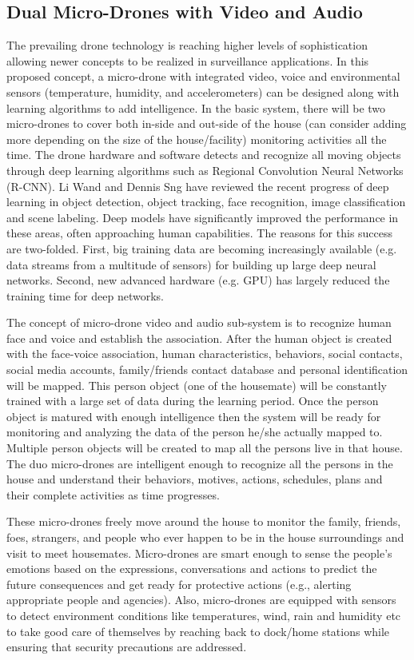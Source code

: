 \documentclass[sigconf]{acmart}
\begin{document}
\subsection{Dual Micro-Drones with Video and Audio}
The prevailing drone technology is reaching higher levels of sophistication allowing newer concepts to be realized in surveillance applications. In this proposed concept, a micro-drone with integrated video, voice and environmental sensors (temperature, humidity, and accelerometers) can be designed along with learning algorithms to add intelligence. In the basic system, there will be two micro-drones to cover both in-side and out-side of the house (can consider adding more depending on the size of the house/facility) monitoring activities all the time. The drone hardware and software detects and recognize all moving objects through deep learning algorithms such as Regional Convolution Neural Networks (R-CNN). Li Wand and Dennis Sng have reviewed the recent progress of deep learning in object detection, object tracking, face recognition, image classification and scene labeling. Deep models have significantly improved the performance in these areas, often approaching human capabilities. The reasons for this success are two-folded. First, big training data are becoming increasingly available (e.g. data streams from a multitude of sensors) for building up large deep neural networks. Second, new advanced hardware (e.g. GPU) has largely reduced the training time for deep networks\cite{Wang2015}. 

The concept of micro-drone video and audio sub-system is to recognize human face and voice and establish the association. After the human object is created with the face-voice association, human characteristics, behaviors, social contacts, social media accounts, family/friends contact database and personal identification will be mapped. This person object (one of the housemate) will be constantly trained with a large set of data during the learning period. Once the person object is matured with enough intelligence then the system will be ready for monitoring and analyzing the data of the person he/she actually mapped to. Multiple person objects will be created to map all the persons live in that house. The duo micro-drones are intelligent enough to recognize all the persons in the house and understand their behaviors, motives, actions, schedules, plans and their complete activities as time progresses.  

These micro-drones freely move around the house to monitor the family, friends, foes, strangers, and people who ever happen to be in the house surroundings and visit to meet housemates. Micro-drones are smart enough to sense the people's emotions based on the expressions, conversations and actions to predict the future consequences and get ready for protective actions (e.g., alerting appropriate people and agencies). Also, micro-drones are equipped with sensors to detect environment conditions like temperatures, wind, rain and humidity etc to take good care of themselves by reaching back to dock/home stations while ensuring that security precautions are addressed. 
\end{document}
